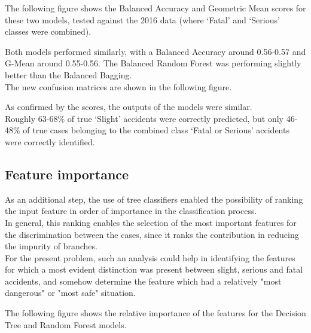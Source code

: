 \documentclass[11pt]{article}
\begin{document}
The following figure shows the Balanced Accuracy and Geometric Mean scores for these two models, tested against the 2016 data (where `Fatal' and `Serious' classes were combined).

    \begin{center}
    \end{center}
    
Both models performed similarly, with a Balanced Accuracy around 0.56-0.57 and G-Mean around 0.55-0.56. The Balanced Random Forest was performing slightly better than the Balanced Bagging.\\
The new confusion matrices are shown in the following figure.

    \begin{center}
    \end{center}
    
As confirmed by the scores, the outputs of the models were similar.\\
Roughly 63-68\% of true `Slight' accidents were correctly predicted, but only 46-48\% of true cases belonging to the combined class `Fatal or Serious' accidents were correctly identified.

    \hypertarget{feature-importance}{%
\subsection{Feature importance}\label{feature-importance}}

As an additional step, the use of tree classifiers enabled the possibility of ranking the input feature in order of importance in the classification process.\\
In general, this ranking enables the selection of the most important features for the discrimination between the cases, since it ranks the contribution in reducing the impurity of branches.\\
For the present problem, such an analysis could help in identifying the features for which a most evident distinction was present between slight, serious and fatal accidents, and somehow determine the feature which had a relatively "most dangerous" or "most safe" situation.

The following figure shows the relative importance of the features for the Decision Tree and Random Forest models.

    \begin{center}
    \end{center}
\end{document}
